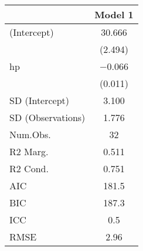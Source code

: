 \begin{table}
\centering
\begin{tabular}[t]{lc}
\toprule
  & Model 1\\
\midrule
(Intercept) & \num{30.666}\\
 & (\num{2.494})\\
hp & \num{-0.066}\\
 & (\num{0.011})\\
SD (Intercept) & \num{3.100}\\
SD (Observations) & \num{1.776}\\
Num.Obs. & \num{32}\\
R2 Marg. & \num{0.511}\\
\midrule
R2 Cond. & \num{0.751}\\
AIC & \num{181.5}\\
BIC & \num{187.3}\\
ICC & \num{0.5}\\
RMSE & \num{2.96}\\
\bottomrule
\end{tabular}
\end{table}

